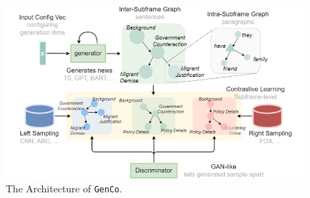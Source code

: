 \begin{figure}[ht]
    \centering
    \includegraphics[width=\textwidth]{img/genco}
    \caption{The Architecture of \texttt{GenCo}.}
    \label{fig:genco}
\end{figure}

